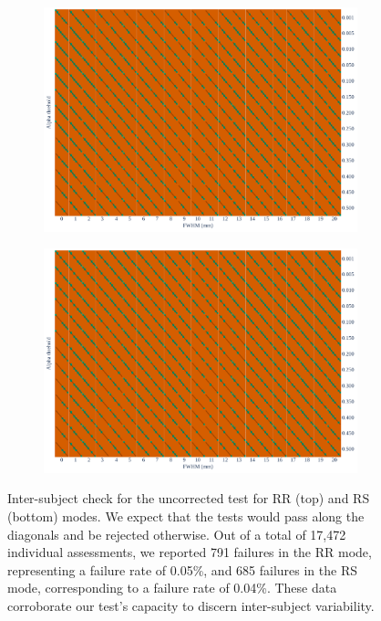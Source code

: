 \documentclass{article}
\begin{document}
\begin{appendices}

    \begin{figure}
        \centering
        \begin{subfigure}[t]{0.7\linewidth}
            \includegraphics[width=\linewidth]{figures/inter-subject/one_pce_RR.pdf}
        \end{subfigure}
        \begin{subfigure}[t]{0.7\linewidth}
            \includegraphics[width=\linewidth]{figures/inter-subject/one_pce_RS.pdf}
        \end{subfigure}
        \caption{Inter-subject check for the uncorrected test for RR (top) and RS (bottom) modes. We expect that the tests would pass along the diagonals and be rejected otherwise.
            Out of a total of 17,472 individual assessments, we reported 791 failures in the RR mode, representing a failure rate of 0.05\%, and 685 failures in the RS mode, corresponding to a failure rate of 0.04\%. These data corroborate our test's capacity to discern inter-subject variability.
        }
        \label{fig:ieee-check-pce}
    \end{figure}



\end{appendices}
\end{document}

